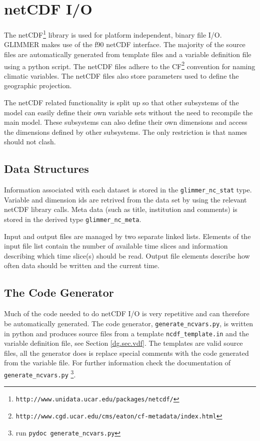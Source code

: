 \section{netCDF I/O}
The netCDF\footnote{\texttt{http://www.unidata.ucar.edu/packages/netcdf/}} library is used for platform independent, binary file I/O. GLIMMER makes use of the f90 netCDF interface. The majority of the source files are automatically generated from template files and a variable definition file using a python script. The netCDF files adhere to the CF\footnote{\texttt{http://www.cgd.ucar.edu/cms/eaton/cf-metadata/index.html}} convention for naming climatic variables. The netCDF files also store parameters used to define the geographic projection.

The netCDF related functionality is split up so that other subsystems of the model 
can easily define their own variable sets without the need to recompile the main model. 
These subsystems can also define their own dimensions and access the dimensions 
defined by other subsystems. The only restriction is that names should not clash. 

\subsection{Data Structures}
Information associated with each dataset is stored in the \texttt{glimmer\_nc\_stat} type. Variable and dimension ids are retrived from the data set by using the relevant netCDF library calls. Meta data (such as title, institution and comments) is stored in the derived type \texttt{glimmer\_nc\_meta}.

Input and output files are managed by two separate linked lists. Elements of the input file list contain the number of available time slices and information describing which time slice(s) should be read. Output file elements describe how often data should be written and the current time.

\subsection{The Code Generator}
Much of the code needed to do netCDF I/O is very repetitive and can therefore 
be automatically generated. The code generator, \texttt{generate\_ncvars.py}, 
is written in python and produces source files from a template \texttt{ncdf\_template.in} 
and the variable definition file, see Section \ref{dg.sec.vdf}. The templates are 
valid source files, all the generator does is replace special comments with 
the code generated from the variable file. For further information check 
the documentation of \texttt{generate\_ncvars.py}
\footnote{run \texttt{pydoc generate\_ncvars.py}}.

